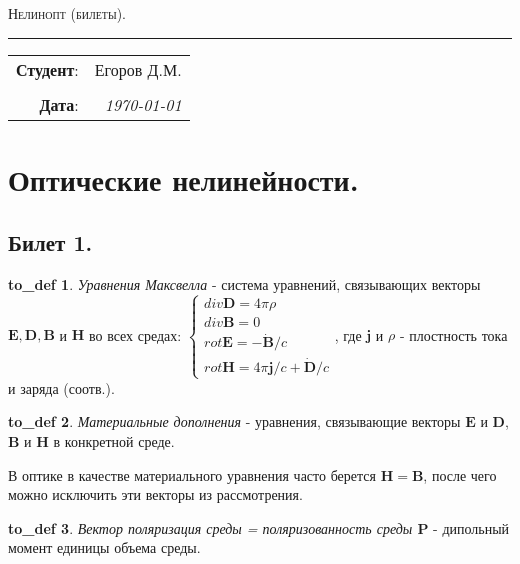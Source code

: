 \documentclass[a4paper,12pt]{article}
\theoremstyle{definition} %
\theoremstyle{definition} %
\newtheorem{to_def}{to_def}[section]
\theoremstyle{remark} %
\begin{document}
\begin{center}
	\LARGE \textsc{Нелинопт (билеты).}
\end{center}

\hrule

\phantom{42}

\begin{flushright}
	\begin{tabular}{rr}
		\textbf{Студент}: 
		& Егоров Д.М. \\
		&\\
		\textbf{Дата}: &
		\textit{\today}\\
	\end{tabular}
\end{flushright}

\thispagestyle{empty}
\tableofcontents
\newpage


\section{Оптические нелинейности.}
\subsection{Билет 1.}

\begin{to_def}
	\textit{Уравнения Максвелла} - система уравнений, связывающих векторы $\mathbf{E}, \mathbf{D}, \mathbf{B}$ и $\mathbf{H}$  во всех средах: $
	\begin{cases}
		div \mathbf{D} = 4 \pi \rho \\
		div \mathbf{B} = 0 \\
		rot \mathbf{E} = -\dot{\mathbf{B}}/c \\
		rot \mathbf{H} = 4\pi \mathbf{j}/c + \dot{\mathbf{D}}/c
	\end{cases}$, где $\mathbf{j}$ и $\rho$ - плостность тока и заряда (соотв.).
\end{to_def}
\begin{to_def}
	\textit{Материальные дополнения} - уравнения, связывающие векторы $\mathbf{E}$ и $\mathbf{D}$, $\mathbf{B}$ и $\mathbf{H}$ в конкретной среде.
\end{to_def}

В оптике в качестве материального уравнения часто берется $\mathbf{H}=\mathbf{B}$, после чего можно исключить эти векторы из рассмотрения.

\begin{to_def}
	\textit{Вектор поляризация среды = поляризованность среды $\mathbf{P}$} - дипольный момент единицы объема среды.
\end{to_def}
\end{document}

